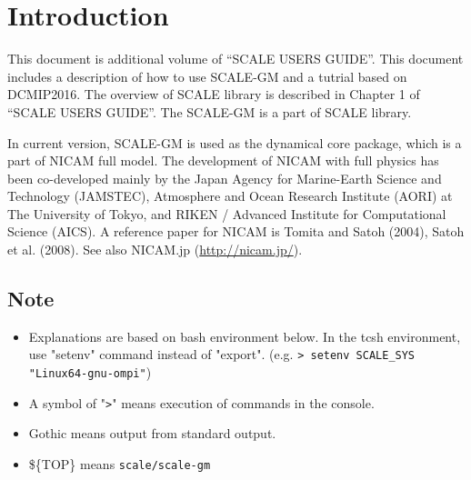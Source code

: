 \section{Introduction}

This document is additional volume of ``SCALE USERS GUIDE''.
This document includes a description of how to use SCALE-GM and a tutrial based on DCMIP2016.
The overview of SCALE library is described in Chapter 1 of ``SCALE USERS GUIDE''.
The SCALE-GM is a part of SCALE library.

In current version, SCALE-GM is used as the dynamical core package, which is a part of NICAM full model.
The development of NICAM with full physics has been co-developed mainly by
the Japan Agency for Marine-Earth Science and Technology (JAMSTEC), Atmosphere
and Ocean Research Institute (AORI) at The University of Tokyo, and RIKEN / Advanced
Institute for Computational Science (AICS). A reference paper for NICAM is
Tomita and Satoh (2004), Satoh et al. (2008). See also NICAM.jp (\url{http://nicam.jp/}).

\subsection{Note}

 \begin{itemize}
   \item Explanations are based on bash environment below.
         In the tcsh environment, use "setenv" command instead of "export".
         (e.g. \verb|> setenv SCALE_SYS "Linux64-gnu-ompi"|)
   \item A symbol of "\verb|>|" means execution of commands in the console.
   \item Gothic means output from standard output.
   \item \$\{TOP\}   means \verb|scale/scale-gm|
 \end{itemize}

